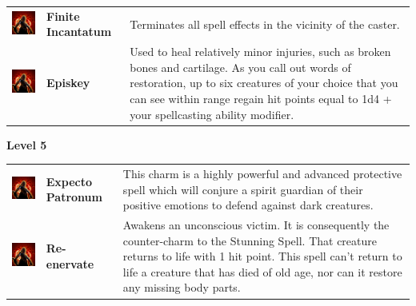 \begin{tabular}{ m{4cm}m{3cm}m{6cm} } 
	\includegraphics[width=4cm]{../Pictures/Gameplay/Spells/Icon/spell_icon.png} & \textbf{Finite Incantatum} & Terminates all spell effects in the vicinity of the caster. \\ 
   \includegraphics[width=4cm]{../Pictures/Gameplay/Spells/Icon/spell_icon.png} & \textbf{Episkey} & Used to heal relatively minor injuries, such as broken bones and cartilage. As you call out words of restoration, up to six creatures of your choice that you can see within range regain hit points equal to 1d4 + your spellcasting ability modifier.\\ 
\end{tabular}
\textbf{Level 5 } 
\begin{tabular}{ m{4cm}m{3cm}m{6cm} } 
	\includegraphics[width=4cm]{../Pictures/Gameplay/Spells/Icon/spell_icon.png} & \textbf{Expecto Patronum} & This charm is a highly powerful and advanced protective spell which will conjure a spirit guardian of their positive emotions to defend against dark creatures.  \\  %
	\includegraphics[width=4cm]{../Pictures/Gameplay/Spells/Icon/spell_icon.png} & \textbf{Re-enervate} & Awakens an unconscious victim. It is consequently the counter-charm to the Stunning Spell. That creature returns to life with 1 hit point. This spell can't return to life a creature that has died of old age, nor can it restore any missing body parts. \\ 
\end{tabular}
